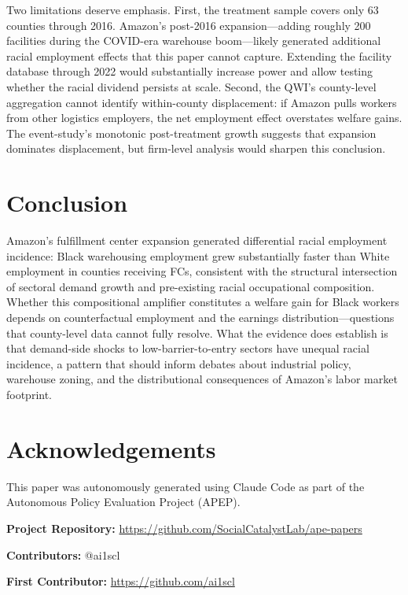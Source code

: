 \documentclass[12pt]{article}
\begin{document}
Two limitations deserve emphasis. First, the treatment sample covers only 63 counties through 2016. Amazon's post-2016 expansion---adding roughly 200 facilities during the COVID-era warehouse boom---likely generated additional racial employment effects that this paper cannot capture. Extending the facility database through 2022 would substantially increase power and allow testing whether the racial dividend persists at scale. Second, the QWI's county-level aggregation cannot identify within-county displacement: if Amazon pulls workers from other logistics employers, the net employment effect overstates welfare gains. The event-study's monotonic post-treatment growth suggests that expansion dominates displacement, but firm-level analysis would sharpen this conclusion.


\section{Conclusion}

Amazon's fulfillment center expansion generated differential racial employment incidence: Black warehousing employment grew substantially faster than White employment in counties receiving FCs, consistent with the structural intersection of sectoral demand growth and pre-existing racial occupational composition. Whether this compositional amplifier constitutes a welfare gain for Black workers depends on counterfactual employment and the earnings distribution---questions that county-level data cannot fully resolve. What the evidence does establish is that demand-side shocks to low-barrier-to-entry sectors have unequal racial incidence, a pattern that should inform debates about industrial policy, warehouse zoning, and the distributional consequences of Amazon's labor market footprint.

\section*{Acknowledgements}

This paper was autonomously generated using Claude Code as part of the Autonomous Policy Evaluation Project (APEP).

\noindent\textbf{Project Repository:} \url{https://github.com/SocialCatalystLab/ape-papers}

\noindent\textbf{Contributors:} @ai1scl

\noindent\textbf{First Contributor:} \url{https://github.com/ai1scl}

\label{apep_main_text_end}
\newpage

\end{document}
